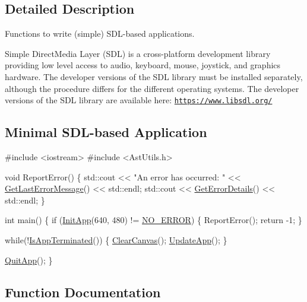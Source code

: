 \subsection{Detailed Description}
Functions to write (simple) S\+D\+L-\/based applications. 

Simple Direct\+Media Layer (S\+DL) is a cross-\/platform development library providing low level access to audio, keyboard, mouse, joystick, and graphics hardware. The developer versions of the S\+DL library must be installed separately, although the procedure differs for the different operating systems. The developer versions of the S\+DL library are available here\+: \href{https://www.libsdl.org/}{\tt https\+://www.\+libsdl.\+org/}\hypertarget{group__sdl__group_sdl_example_sect}{}\subsection{Minimal S\+D\+L-\/based Application}\label{group__sdl__group_sdl_example_sect}

\begin{DoxyCode}
\textcolor{preprocessor}{#include <iostream>}
\textcolor{preprocessor}{#include <AstUtils.h>}

\textcolor{keywordtype}{void} ReportError()
\{
    std::cout << \textcolor{stringliteral}{"An error has occurred: "} << \hyperlink{group__error__group_gac9be83c8ac2a5d80a2be46487c596eab}{GetLastErrorMessage}() << std::endl;
    std::cout << \hyperlink{group__error__group_ga8258f5044a56ed71aeed5633fc8341b6}{GetErrorDetails}() << std::endl;
\}

\textcolor{keywordtype}{int} main()
\{
    \textcolor{keywordflow}{if} (\hyperlink{group__sdl__group_ga8f43e7993cf196bb0af33a60bc93aa75}{InitApp}(640, 480) != \hyperlink{group__error__group_gga59e56af19e754a6aa26a612ebf91d05fabf350750d0d4fabd8954c0f1e9bbae94}{NO\_ERROR}) \{
        ReportError();
        \textcolor{keywordflow}{return} -1;
    \}

    \textcolor{keywordflow}{while}(!\hyperlink{group__sdl__group_ga6d29aa641d22a0299da4710022c8c96b}{IsAppTerminated}()) \{
        \hyperlink{group__sdl__group_ga4cc0ada571b47d2b809d441fa6766b52}{ClearCanvas}();
        \hyperlink{group__sdl__group_ga9bf9bfe01e7d336c3a3b13cc923ff850}{UpdateApp}();
    \}

    \hyperlink{group__sdl__group_gaf4cba1685a7c46bccc7bbdf863114cee}{QuitApp}();
\} 
\end{DoxyCode}
 

\subsection{Function Documentation}
\mbox{\label{group__sdl__group_ga4cc0ada571b47d2b809d441fa6766b52}} 
